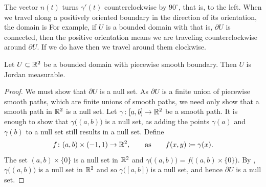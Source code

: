 \begin{myfigureht}
\caption{Positively oriented domain (left), and a positively oriented
domain with a hole (right).\label{fig:positiveorient}}
\end{myfigureht}

The vector $n(t)$ turns $\gamma'(t)$
counterclockwise by $90^\circ$, that is, to the left.
When we travel along a positively oriented boundary
in the direction of its orientation,
the domain is 
For example,
if $U$ is a bounded domain with  that is, $\partial U$
is connected, then the positive orientation means we are traveling
counterclockwise around $\partial U$.  If we do have  then we
travel around them clockwise.

\begin{prop}
Let $U \subset {\mathbb{R}}^2$ be a bounded domain with piecewise smooth boundary.
Then $U$ is Jordan measurable.
\end{prop}

\begin{proof}
We must show that
$\partial U$ is a null set.  As $\partial U$ is a finite
union of piecewise smooth paths, which 
are finite unions of smooth paths, we need only show that 
a smooth path in ${\mathbb{R}}^2$ is a null set.
Let $\gamma \colon [a,b] \to {\mathbb{R}}^2$ be a smooth path.
It is enough to show that
$\gamma\bigl((a,b)\bigr)$ is a null set, as adding 
the points $\gamma(a)$ and $\gamma(b)$
to a null set still results in a null set.
Define
\begin{equation*}
f \colon (a,b) \times (-1,1) \to {\mathbb{R}}^2,
\qquad \text{as} \qquad
f(x,y) \coloneqq \gamma(x) .
\end{equation*}
The set $(a,b) \times \{ 0 \}$ is a null set in ${\mathbb{R}}^2$ and
$\gamma\bigl((a,b)\bigr) = f\bigl( (a,b) \times \{ 0 \} \bigr)$.
By , 
$\gamma\bigl((a,b)\bigr)$ is a null set in ${\mathbb{R}}^2$
and so
$\gamma\bigl([a,b]\bigr)$ is a null set, and 
hence $\partial U$ is a null set.
\end{proof}

